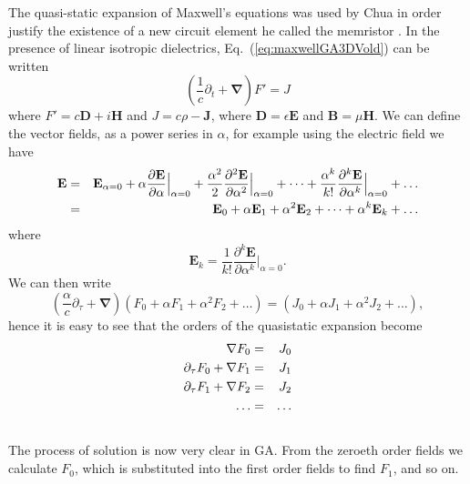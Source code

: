 \documentclass[12pt,aps,prb,preprint]{revtex4}   %
\newcommand{\iGA}{{i}}
\begin{document}
The quasi-static expansion of Maxwell's equations was used by Chua in order justify the existence of a new circuit element he called the memristor \cite{Chua1971}.  In the presence of linear isotropic dielectrics, Eq.~(\ref{eq:maxwellGA3DVold}) can be written
\begin{equation} \label{MaxwellDielectrics}
\left (\frac{1}{c} \partial_t + \mathbf{\nabla} \right ) F' = J
\end{equation}
where $ F' = c \textbf{D} + \iGA \textbf{H} $ and $J = c \rho - \textbf{J} $, where $ \textbf{D} = \epsilon \textbf{E} $ and $ \textbf{B} = \mu \textbf{H}$.
We can define the vector fields, as a power series in $\alpha $, for example
using the electric field we have 
\begin{eqnarray}
\textbf{E} &=&\textbf{E}_{\alpha =0}+\alpha \frac{\partial \textbf{E}}{%
\partial \alpha }\Big|_{\alpha =0}+\frac{\alpha ^{2}}{2}\frac{\partial ^{2}%
\textbf{E}}{\partial \alpha ^{2}}\Big|_{\alpha =0}+\dots +\frac{\alpha ^{k}}{%
k!}\frac{\partial ^{k}\textbf{E}}{\partial \alpha ^{k}}\Big|_{\alpha
=0}+\dots  \notag  \label{EPowerSeries} \\
&=&\textbf{E}_{0}+\alpha \textbf{E}_{1}+\alpha ^{2}\textbf{E}_{2}+\dots
+\alpha ^{k}\textbf{E}_{k}+\dots  \label{PowerSeriesE}
\end{eqnarray}%
where 
\begin{equation}
\textbf{E}_{k}=\frac{1}{k!}\frac{\partial ^{k}\textbf{E}}{\partial \alpha
^{k}}\Big|_{\alpha =0} .
\end{equation}%
We can then write
\begin{equation}
\left (\frac{\alpha}{c} \partial_{\tau} + \mathbf{\nabla} \right ) \left  (F_0 + \alpha F_1 +
\alpha^2 F_2 + \dots \right ) = \left (J_0 + \alpha J_1 + \alpha^2 J_2 + \dots \right ),
\end{equation}
hence it is easy to see that the orders of the quasistatic expansion become 
\begin{eqnarray}
\mathbf{\nabla} F_0 & = & J_0 \\
\partial_{\tau} F_0 + \mathbf{\nabla} F_1 & = & J_1  \notag \\
\partial_{\tau} F_1 + \mathbf{\nabla} F_2 & = & J_2  \notag \\
\dots & = & \dots  \notag \\
\notag
\end{eqnarray}
The process of solution is now very clear in GA. From the zeroeth order fields we
calculate $F_0 $, which is substituted into the first order fields to find $ F _1 $, and so on.
\end{document}
